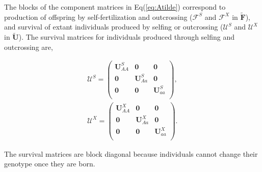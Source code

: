 \documentclass[11pt]{article}
\def\mbf#1{\mathbf{#1}}
\def\mcal#1{\mathcal{#1}}
\begin{document}
The blocks of the component matrices in Eq(\ref{eq:Atilde}) correspond to production of offspring by self-fertilization and outcrossing ($\mcal{F}^S$ and $\mcal{F}^X$ in $\tilde{\mbf{F}}$), and survival of extant individuals produced by selfing or outcrossing ($\mcal{U}^S$ and $\mcal{U}^X$ in $\tilde{\mbf{U}}$). The survival matrices for individuals produced through selfing and outcrossing are,
\begin{linenomath*}
\begin{eqnarray} 
	\mcal{U}^S  = 
		\left(
			\begin{array}{ccc}
				\mbf{U}^{S}_{AA} & \mbf{0} & \mbf{0} \\
				\mbf{0} & \mbf{U}^{S}_{Aa} & \mbf{0} \\
				\mbf{0} & \mbf{0} & \mbf{U}^{S}_{aa} \\
			\end{array} \right),\label{eq:BlkUS}\\
				\mcal{U}^X  = 
		\left(
			\begin{array}{ccc}
				\mbf{U}^{X}_{AA} & \mbf{0} & \mbf{0} \\
				\mbf{0} & \mbf{U}^{X}_{Aa} & \mbf{0} \\
				\mbf{0} & \mbf{0} & \mbf{U}^{X}_{aa} \\
			\end{array} \right).\label{eq:BlkUX}
\end{eqnarray}
\end{linenomath*}
The survival matrices are block diagonal because individuals cannot change their genotype once they are born.  
\end{document}
